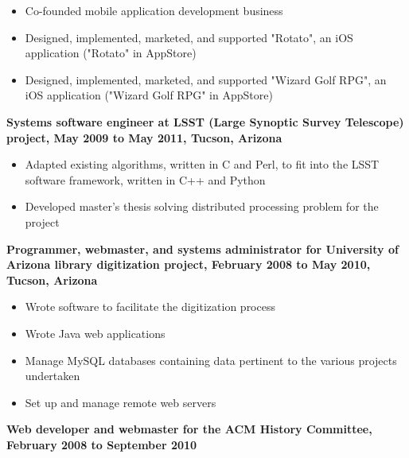 \documentclass[10pt]{res}
\begin{document}
\begin{resume}
\begin{itemize}
\setlength{\itemsep}{1pt}
\setlength{\parskip}{0pt}
\setlength{\parsep}{0pt}
\item Co-founded mobile application development business
\item Designed, implemented, marketed, and supported "Rotato", an iOS application ("Rotato" in AppStore)
\item Designed, implemented, marketed, and supported "Wizard Golf RPG", an iOS application ("Wizard Golf RPG" in AppStore)
\end{itemize}

\begin{flushleft}
{\bf Systems software engineer at LSST (Large Synoptic Survey Telescope) project, May 2009 to May 2011, Tucson, Arizona}
\end{flushleft}

\begin{itemize}
\setlength{\itemsep}{1pt}
\setlength{\parskip}{0pt}
\setlength{\parsep}{0pt}
\item Adapted existing algorithms, written in C and Perl, to fit into the LSST software framework, written in C++ and Python
\item Developed master's thesis  solving distributed processing problem for the project
\end{itemize}


\begin{flushleft}
{\bf Programmer, webmaster, and systems administrator for University of Arizona library digitization project, February 2008 to May 2010, Tucson, Arizona}
\end{flushleft}

\begin{itemize}
\setlength{\itemsep}{1pt}
\setlength{\parskip}{0pt}
\setlength{\parsep}{0pt}
\item Wrote software to facilitate the digitization process
\item Wrote Java web applications
\item Manage MySQL databases containing data pertinent to the various projects undertaken
\item Set up and manage remote web servers
\end{itemize}

\begin{flushleft}
{\bf Web developer and webmaster for the ACM History Committee, February 2008 to September 2010}
\end{flushleft}


\end{resume}
\end{document}
